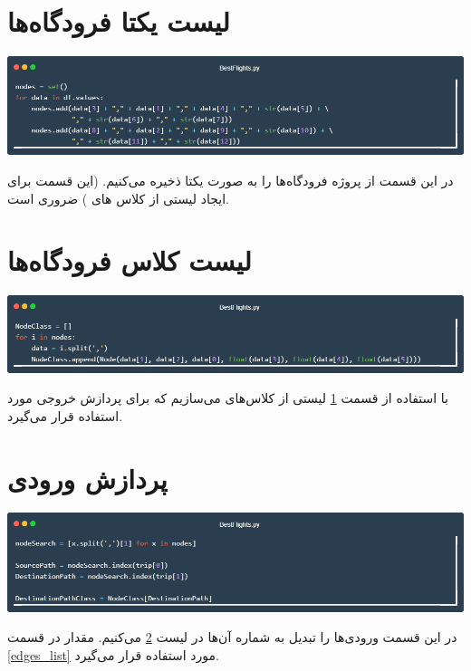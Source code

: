 \documentclass[12pt, dvipsnames, svgnames, x11names,]{article}
\begin{document}
	
	\section{لیست یکتا فرودگاه‌ها} \label{unique_nodes}
	
		{\includegraphics[width=14cm]{images/code06}} \par
		{\normalsize 
			در این قسمت از پروژه فرودگاه‌ها را به صورت یکتا  ذخیره می‌کنیم.
	(این قسمت برای ایجاد لیستی از کلاس های ) ضروری است.
		}
	
		
	
	\section{لیست کلاس فرودگاه‌ها } \label{node_list}
	
		{\includegraphics[width=14cm]{images/code07}} \par
		{\normalsize 
			با استفاده از قسمت \ref{unique_nodes} لیستی از کلاس‌های  می‌سازیم که برای پردازش خروجی مورد استفاده قرار می‌گیرد.
		}
	
	
	
	
	\section{پردازش ورودی} \label{input_proccess}
	
		{\includegraphics[width=14cm]{images/code10}} \par
		{\normalsize 
			در این قسمت ورودی‌ها را تبدیل به شماره آن‌ها در لیست \ref{node_list} می‌کنیم.
			مقدار  در قسمت \ref{edges_list} مورد استفاده قرار می‌گیرد.
		}
	
\end{document}
